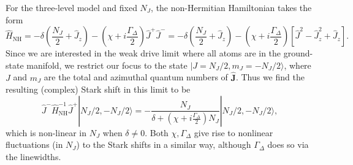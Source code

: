 \documentclass[11pt]{article}
\begin{document}
For the three-level model and fixed $N_J$, the non-Hermitian Hamiltonian takes the form
\begin{subequations}
\begin{equation}
    \hat H_{{{\text{NH}}}} = -\delta \left(\frac{N_J}{2} + \hat J_z\right) - \left(\chi + i \frac{\Gamma_\Delta}{2} \right) \hat J^+ \hat J^- = -\delta \left(\frac{N_J}{2} + \hat J_z\right) - \left(\chi + i \frac{\Gamma_\Delta}{2} \right) \left[ \hat J^2 - \hat J_z^2 + \hat J_z \right].
\end{equation}
\end{subequations}
Since we are interested in the weak drive limit where all atoms are in the ground-state manifold, we restrict our focus to the state $|J = N_J/2, m_J = -N_J /2\rangle$, where $J$ and $m_J$ are the total and azimuthal quantum numbers of $\hat{\mathbf{J}}$. Thus we find the resulting (complex) Stark shift in this limit to be
\begin{equation}
    \hat J^- \hat H_{{\text{NH}}}^{-1} \hat J^+ |N_J/2,-N_J/2 \rangle = -\frac{N_J}{\delta +(\chi + i \frac{\Gamma_\Delta}{2}) N_J} |N_J/2,-N_J/2 \rangle,
\end{equation}
which is non-linear in $N_J$ when $\delta \neq 0$. Both $\chi, \Gamma_\Delta$ give rise to nonlinear fluctuations (in $N_J$) to the Stark shifts in a similar way, although $\Gamma_\Delta$ does so via the linewidths.
\end{document}
